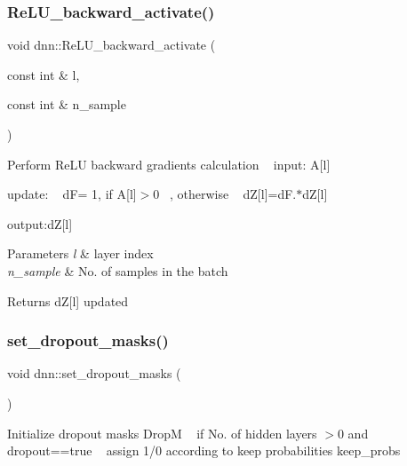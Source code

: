 \subsubsection{\texorpdfstring{Re\+L\+U\+\_\+backward\+\_\+activate()}{ReLU\_backward\_activate()}}
{\footnotesize\ttfamily void dnn\+::\+Re\+L\+U\+\_\+backward\+\_\+activate (\begin{DoxyParamCaption}\item[{const int \&}]{l,  }\item[{const int \&}]{n\+\_\+sample }\end{DoxyParamCaption})}

Perform Re\+LU backward gradients calculation ~\newline
 input\+: A\mbox{[}l\mbox{]} ~\newline


update\+: ~\newline
 dF= 1, if A\mbox{[}l\mbox{]}$>$0 ~, otherwise ~\newline
 dZ\mbox{[}l\mbox{]}=dF.$\ast$dZ\mbox{[}l\mbox{]} ~\newline


output\+:dZ\mbox{[}l\mbox{]} ~\newline
 
\begin{DoxyParams}{Parameters}
{\em l} & layer index \\
\hline
{\em n\+\_\+sample} & No. of samples in the batch \\
\hline
\end{DoxyParams}
\begin{DoxyReturn}{Returns}
dZ\mbox{[}l\mbox{]} updated 
\end{DoxyReturn}
\mbox{\label{classdnn_a3b76e71899549d8b493ebba21e57816a}} 
\subsubsection{\texorpdfstring{set\+\_\+dropout\+\_\+masks()}{set\_dropout\_masks()}}
{\footnotesize\ttfamily void dnn\+::set\+\_\+dropout\+\_\+masks (\begin{DoxyParamCaption}{ }\end{DoxyParamCaption})}

Initialize dropout masks DropM ~\newline
 if No. of hidden layers $>$0 and dropout==true ~\newline
 assign 1/0 according to keep probabilities keep\+\_\+probs ~\newline
 \mbox{\label{classdnn_a09a39f5b6f0b29af3ae470a907e3c097}} 
